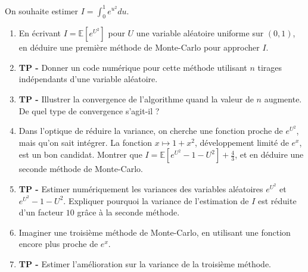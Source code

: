 \documentclass[solutions]{exercices}
\begin{document}
\begin{exercice}
On souhaite estimer $I=\int_0^1 e^{u^2}du$.
\begin{enumerate}
  \item En écrivant $I=\mathbb{E}[e^{U^2}]$ pour $U$ une variable aléatoire uniforme sur $(0,1)$, en déduire une première méthode de Monte-Carlo pour approcher $I$.
  \item \textbf{TP -}  Donner un code numérique pour cette méthode utilisant $n$ tirages indépendants d'une variable aléatoire.
  \item \textbf{TP -}  Illustrer la convergence de l'algorithme quand la valeur de $n$ augmente. De quel type de convergence s'agit-il ?
  \item Dans l'optique de réduire la variance, on cherche une fonction proche de $e^{U^2}$, mais qu'on sait intégrer. La fonction $x\mapsto 1+x^2$,  développement limité de $e^x$, est un bon candidat. Montrer que $I=\mathbb{E}[e^{U^2}-1-U^2]+\frac{4}{3}$, et en déduire une seconde méthode de Monte-Carlo.
  \item \textbf{TP -}  Estimer numériquement les variances des variables aléatoires $e^{U^2}$ et $e^{U^2}-1-U^2$. Expliquer pourquoi la variance de l'estimation de $I$ est réduite d'un facteur $10$ grâce à la seconde méthode.
  \item Imaginer une troisième méthode de Monte-Carlo, en utilisant une fonction encore plus proche de $e^x$.
  \item \textbf{TP -}  Estimer l'amélioration sur la variance de la troisième méthode.
\end{enumerate}
\end{exercice}
\end{document}
